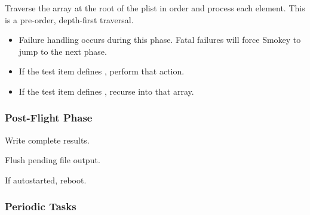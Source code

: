 \begin{Process}[resume]

	\item Traverse the  array at the root of the plist in order
	and process each element.  This is a pre-order, depth-first traversal.

	\begin{itemize}

		\item Failure handling occurs during this phase.  Fatal
		failures will force Smokey to jump to the next phase.

		\item If the test item defines , perform
		that action.


		\item If the test item defines , recurse into that
		array.

	\end{itemize}

\end{Process}

\subsubsection{Post-Flight Phase}

\begin{Process}[resume]

	\item Write complete results.

	\item Flush pending file output.

	\item If autostarted, reboot.

\end{Process}

\subsubsection{Periodic Tasks}

